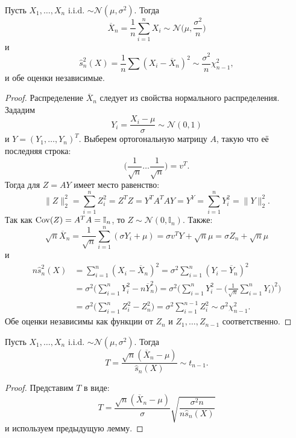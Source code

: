 \begin{lmm} \label{Distribution of estimators of Normal distribution}
	Пусть $X_1, \dots, X_n$ i.i.d. $\sim \mathcal{N}(\mu,\sigma^2)$. Тогда
	\[ \overline{X}_n=\frac{1}{n}\sum_{i=1}^n X_i \sim \mathcal{N}\Big(\mu,\frac{\sigma^2}{n}\Big) \]
	и
	\[ \hat{s}_n^2(X)=\frac{1}{n}\sum(X_i-\overline{X}_n)^2 \sim \frac{\sigma^2}{n}\chi_{n-1}^2,  \]
	и обе оценки независимые.
\end{lmm}
\begin{proof}
	Распределение $\overline{X}_n$ следует из свойства нормального распределения. Зададим
	\[ Y_i=\frac{X_i-\mu}{\sigma} \sim \mathcal{N}(0,1) \]
	и $Y=(Y_1, \dots, Y_n)^T$. Выберем ортогональную матрицу $A$, такую что её последняя строка:
	\[\bigg(\frac{1}{\sqrt{n}} \dots \frac{1}{\sqrt{n}}\bigg) = v^T.\]
	Тогда для $Z=AY$ имеет место равенство:
	\[ \|Z\|_2^2=\sum_{i=1}^nZ_i^2=Z^TZ=Y^TA^TAY=Y^Y=\sum_{i=1}^nY_i^2=\|Y\|_2^2.\]
	Так как $\mathrm{Cov}(Z)=A^TA=\mathbb{I}_n$, то $Z \sim \mathcal{N}(0, \mathbb{I}_n)$. Также:
	\[ \sqrt{n}\overline{X}_n=\frac{1}{\sqrt{n}}\sum_{i=1}^n(\sigma Y_i + \mu)=\sigma v^TY+\sqrt{n}\mu=\sigma Z_n+\sqrt{n}\mu \]
	и
	\[ \begin{aligned}
	n\hat{s}_n^2(X) & =\sum_{i=1}^n(X_i-\overline{X}_n)^2=\sigma^2\sum_{i=1}^n(Y_i-\overline{Y}_n)^2 \\
	& = \sigma^2\Big(\sum_{i=1}^nY_i^2-n\overline{Y}_n^2\Big) = \sigma^2 \Big(\sum_{i=1}^nY_i^2 - \Big( \frac{1}{\sqrt{n}}\sum_{i=1}^nY_i \Big)^2 \Big) \\
	& = \sigma^2\Big(\sum_{i=1}^n  Z_i^2-Z_n^2 \Big) = \sigma^2 \sum_{i=1}^{n-1} Z_i^2 \sim \sigma^2 \chi_{n-1}^2.
	\end{aligned} \] 
	Обе оценки независимы как функции от $Z_n$ и $Z_1, \dots, Z_{n-1}$ соответственно.
\end{proof}

\begin{crlr} \label{crlr2.21}
	Пусть $X_1, \dots, X_n$ i.i.d. $\sim \mathcal{N}(\mu,\sigma^2)$. Тогда
	\[ T=\frac{\sqrt{n}(\overline{X}_n-\mu)}{\hat{s}_n(X)} \sim t_{n-1}. \]
\end{crlr}
\begin{proof}
	Представим $T$ в виде:
	\[ T= \frac{\sqrt{n}(\overline{X}_n-\mu)}{\sigma} \sqrt{\frac{\sigma^2 n}{n \hat{s}_n(X)}}\]
	и используем предыдущую лемму.
\end{proof}

